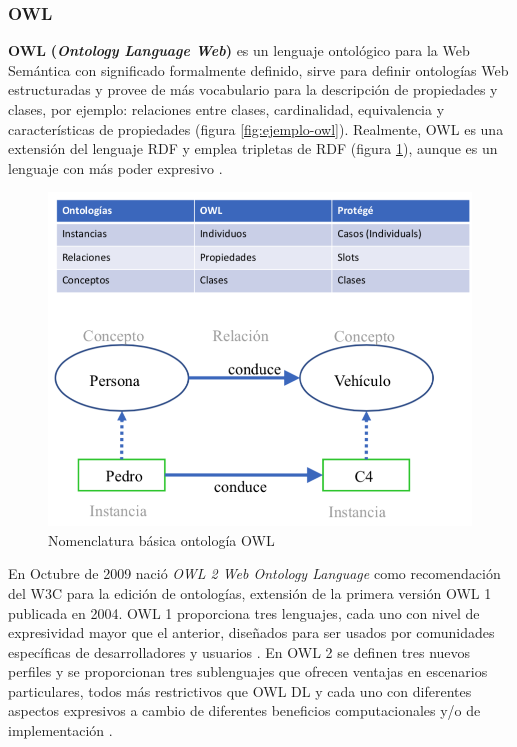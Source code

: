\subsubsection{OWL}

\textbf{OWL} \textbf{(\textit{Ontology Language Web})} es un lenguaje ontológico para la Web Semántica con significado formalmente definido, sirve para definir ontologías Web estructuradas y provee de más vocabulario para la descripción de propiedades y clases, por ejemplo: relaciones entre clases, cardinalidad, equivalencia y características de propiedades (figura \ref{fig:ejemplo-owl}). Realmente, OWL es una extensión del lenguaje RDF y emplea tripletas de RDF (figura \ref{fig:nomenclatura}), aunque es un lenguaje con más poder expresivo \cite{aplicacion}.

\begin{figure}[H]
	\centering
	\includegraphics[width=0.67\linewidth]{imagenes/capitulo3/nomenclatura}
	\caption{Nomenclatura básica ontología OWL \cite{apuntes-clase-jose}}
	\label{fig:nomenclatura}
\end{figure}


En Octubre de 2009 nació \textit{OWL 2 Web Ontology Language} como recomendación del W3C para la edición de ontologías, extensión de la primera versión OWL 1 publicada en 2004. OWL 1 proporciona tres lenguajes, cada uno con nivel de expresividad mayor que el anterior, diseñados para ser usados por comunidades específicas de desarrolladores y usuarios \cite{owl-tipos}. En OWL 2 se definen tres nuevos perfiles y se proporcionan tres sublenguajes que ofrecen ventajas en escenarios particulares, todos más restrictivos que OWL DL y cada uno con diferentes aspectos expresivos a cambio de diferentes beneficios computacionales y/o de implementación \cite{aplicacion}. 

